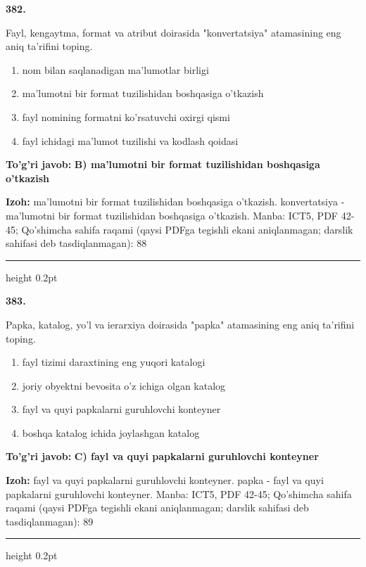 \documentclass[10pt,a4paper]{article}
\begin{document}
{\bfseries\sffamily\color{ink} 382.}
\par
Fayl, kengaytma, format va atribut doirasida "konvertatsiya" atamasining eng aniq ta'rifini toping.
\begin{enumerate}[label=\Alph*),leftmargin=9mm]
\item nom bilan saqlanadigan ma'lumotlar birligi
\item ma'lumotni bir format tuzilishidan boshqasiga o'tkazish
\item fayl nomining formatni ko'rsatuvchi oxirgi qismi
\item fayl ichidagi ma'lumot tuzilishi va kodlash qoidasi
\end{enumerate}
\begin{tcolorbox}[enhanced,breakable,colback=teal!4,colframe=teal!60!black,boxrule=0.45pt,arc=1.2mm,left=2.7mm,right=2.7mm,top=1.8mm,bottom=1.8mm,before skip=2mm,after skip=2mm]
{\bfseries\sffamily\color{teal}To'g'ri javob:} \textbf{B) ma'lumotni bir format tuzilishidan boshqasiga o'tkazish}
\par\smallskip
{\bfseries Izoh:} ma'lumotni bir format tuzilishidan boshqasiga o'tkazish. konvertatsiya - ma'lumotni bir format tuzilishidan boshqasiga o'tkazish. Manba: ICT5, PDF 42-45; Qo'shimcha sahifa raqami (qaysi PDFga tegishli ekani aniqlanmagan; darslik sahifasi deb tasdiqlanmagan): 88
\end{tcolorbox}
\vspace{2mm}\hrule height 0.2pt\vspace{3mm}

{\bfseries\sffamily\color{ink} 383.}
\par
Papka, katalog, yo'l va ierarxiya doirasida "papka" atamasining eng aniq ta'rifini toping.
\begin{enumerate}[label=\Alph*),leftmargin=9mm]
\item fayl tizimi daraxtining eng yuqori katalogi
\item joriy obyektni bevosita o'z ichiga olgan katalog
\item fayl va quyi papkalarni guruhlovchi konteyner
\item boshqa katalog ichida joylashgan katalog
\end{enumerate}
\begin{tcolorbox}[enhanced,breakable,colback=teal!4,colframe=teal!60!black,boxrule=0.45pt,arc=1.2mm,left=2.7mm,right=2.7mm,top=1.8mm,bottom=1.8mm,before skip=2mm,after skip=2mm]
{\bfseries\sffamily\color{teal}To'g'ri javob:} \textbf{C) fayl va quyi papkalarni guruhlovchi konteyner}
\par\smallskip
{\bfseries Izoh:} fayl va quyi papkalarni guruhlovchi konteyner. papka - fayl va quyi papkalarni guruhlovchi konteyner. Manba: ICT5, PDF 42-45; Qo'shimcha sahifa raqami (qaysi PDFga tegishli ekani aniqlanmagan; darslik sahifasi deb tasdiqlanmagan): 89
\end{tcolorbox}
\vspace{2mm}\hrule height 0.2pt\vspace{3mm}
\end{document}
